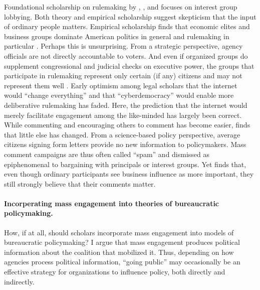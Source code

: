 Foundational scholarship on rulemaking by \citet{Furlong2004}, \citet{Furlong1997, Furlong1998}, and \citet{Kerwin2011} focuses on interest group lobbying. Both theory and empirical scholarship suggest skepticism that the input of ordinary people matters. 
Empirical scholarship finds that economic elites and business groups dominate American politics in general \citep{Gilens2014} and rulemaking in particular \citep{Crow2015, Wagner2011, West2009, Yackee2006JOP, Yackee2006JPART, Yackee2012, Golden1998, Haeder2015}. Perhaps this is unsurprising. 
From a strategic perspective, agency officials are not directly accountable to voters. And even if organized groups do supplement congressional and judicial checks on executive power, the groups that participate in rulemaking represent only certain (if any) citizens and may not represent them well \citep{Seifter2016UCLA}. Early optimism among legal scholars that the internet would ``change everything'' \citep{Johnson1998} and that ``cyberdemocracy''  would enable more deliberative rulemaking has faded.  Here, the prediction that the internet would merely facilitate engagement among the like-minded \citep{Sunstein2001} has largely been correct. While commenting and encouraging others to comment has become easier, \citet{Coglianese2006} finds that little else has changed. 
From a science-based policy perspective, average citizens signing form letters provide no new information to policymakers. 
Mass comment campaigns are thus often called ``spam'' \citep{Balla2018} and dismissed as epiphenomenal to bargaining with principals or interest groups. 
Yet \citet{Yackee2015JPART} finds that, even though ordinary participants see business influence as more important, they still strongly believe that their comments matter.

\paragraph{Incorperating mass engagement into theories of bureaucratic policymaking.}
How, if at all, should scholars incorporate mass engagement into models of bureaucratic policymaking? 
I argue that mass engagement produces political information about the coalition that mobilized it.
Thus, depending on how agencies process political information, ``going public'' may occasionally be an effective strategy for organizations to influence policy, both directly and indirectly.








